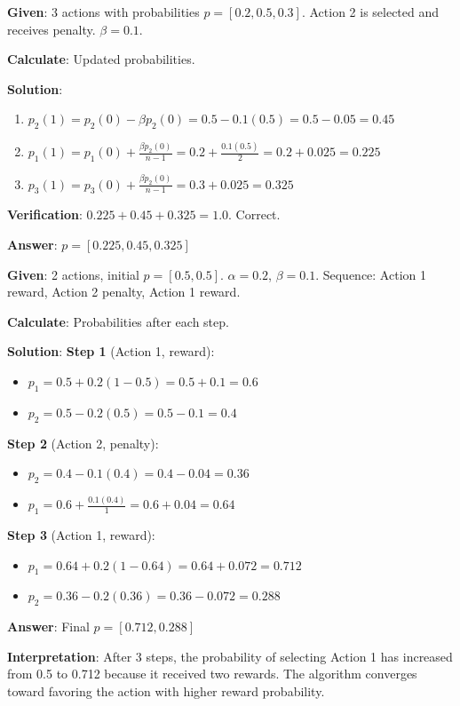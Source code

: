 \documentclass[11pt,a4paper]{article}
\begin{document}
\begin{tcolorbox}[colback=green!5!white,colframe=green!75!black,title=\textbf{Worked Example 14: LR-P Probability Update -- Penalty Case}]
\textbf{Given}: 3 actions with probabilities $p = [0.2, 0.5, 0.3]$. Action 2 is selected and receives penalty. $\beta = 0.1$.

\textbf{Calculate}: Updated probabilities.

\textbf{Solution}:
\begin{enumerate}
    \item $p_2(1) = p_2(0) - \beta p_2(0) = 0.5 - 0.1(0.5) = 0.5 - 0.05 = 0.45$
    \item $p_1(1) = p_1(0) + \frac{\beta p_2(0)}{n-1} = 0.2 + \frac{0.1(0.5)}{2} = 0.2 + 0.025 = 0.225$
    \item $p_3(1) = p_3(0) + \frac{\beta p_2(0)}{n-1} = 0.3 + 0.025 = 0.325$
\end{enumerate}

\textbf{Verification}: $0.225 + 0.45 + 0.325 = 1.0$. Correct.

\textbf{Answer}: $p = [0.225, 0.45, 0.325]$
\end{tcolorbox}

\begin{tcolorbox}[colback=green!5!white,colframe=green!75!black,title=\textbf{Worked Example 15: LR-P Multi-Step Convergence}]
\textbf{Given}: 2 actions, initial $p = [0.5, 0.5]$. $\alpha = 0.2$, $\beta = 0.1$. Sequence: Action 1 reward, Action 2 penalty, Action 1 reward.

\textbf{Calculate}: Probabilities after each step.

\textbf{Solution}:
\textbf{Step 1} (Action 1, reward):
\begin{itemize}
    \item $p_1 = 0.5 + 0.2(1-0.5) = 0.5 + 0.1 = 0.6$
    \item $p_2 = 0.5 - 0.2(0.5) = 0.5 - 0.1 = 0.4$
\end{itemize}

\textbf{Step 2} (Action 2, penalty):
\begin{itemize}
    \item $p_2 = 0.4 - 0.1(0.4) = 0.4 - 0.04 = 0.36$
    \item $p_1 = 0.6 + \frac{0.1(0.4)}{1} = 0.6 + 0.04 = 0.64$
\end{itemize}

\textbf{Step 3} (Action 1, reward):
\begin{itemize}
    \item $p_1 = 0.64 + 0.2(1-0.64) = 0.64 + 0.072 = 0.712$
    \item $p_2 = 0.36 - 0.2(0.36) = 0.36 - 0.072 = 0.288$
\end{itemize}

\textbf{Answer}: Final $p = [0.712, 0.288]$

\textbf{Interpretation}: After 3 steps, the probability of selecting Action 1 has increased from 0.5 to 0.712 because it received two rewards. The algorithm converges toward favoring the action with higher reward probability.
\end{tcolorbox}
\end{document}
